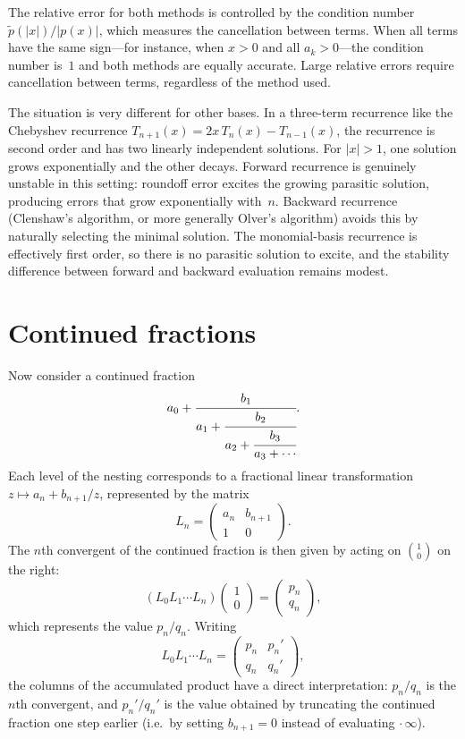 \documentclass{article}
\begin{document}
The relative error for both methods is controlled by the condition number $\tilde p(|x|)/|p(x)|$, which measures the cancellation between terms. When all terms have the same sign---for instance, when $x > 0$ and all $a_k > 0$---the condition number is~$1$ and both methods are equally accurate. Large relative errors require cancellation between terms, regardless of the method used.

The situation is very different for other bases. In a three-term recurrence like the Chebyshev recurrence $T_{n+1}(x) = 2x\,T_n(x) - T_{n-1}(x)$, the recurrence is second order and has two linearly independent solutions. For $|x| > 1$, one solution grows exponentially and the other decays. Forward recurrence is genuinely unstable in this setting: roundoff error excites the growing parasitic solution, producing errors that grow exponentially with~$n$. Backward recurrence (Clenshaw's algorithm, or more generally Olver's algorithm) avoids this by naturally selecting the minimal solution. The monomial-basis recurrence is effectively first order, so there is no parasitic solution to excite, and the stability difference between forward and backward evaluation remains modest.

\section{Continued fractions}

Now consider a continued fraction
\begin{equation}
  a_0 + \cfrac{b_1}{a_1 + \cfrac{b_2}{a_2 + \cfrac{b_3}{a_3 + \cdots}}}.
\end{equation}
Each level of the nesting corresponds to a fractional linear transformation $z \mapsto a_n + b_{n+1}/z$, represented by the matrix
\begin{equation}
  L_n = \begin{pmatrix} a_n & b_{n+1} \\ 1 & 0 \end{pmatrix}.
\end{equation}
The $n$th convergent of the continued fraction is then given by acting on $\binom{1}{0}$ on the right:
\begin{equation}
  (L_0 L_1 \cdots L_n) \begin{pmatrix} 1 \\ 0 \end{pmatrix} = \begin{pmatrix} p_n \\ q_n \end{pmatrix},
\end{equation}
which represents the value $p_n/q_n$. Writing
\begin{equation}
  L_0 L_1 \cdots L_n = \begin{pmatrix} p_n & p_n' \\ q_n & q_n' \end{pmatrix},
\end{equation}
the columns of the accumulated product have a direct interpretation: $p_n/q_n$ is the $n$th convergent, and $p_n'/q_n'$ is the value obtained by truncating the continued fraction one step earlier (i.e.\ by setting $b_{n+1} = 0$ instead of evaluating $\cdot\,\infty$).
\end{document}

